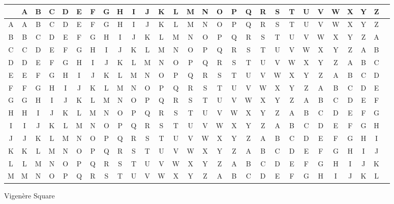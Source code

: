 \documentclass[12pt]{article}
\begin{document}
\begin{figure}[ht]
	
		\caption{Vigen\`{e}re Square}
		\label{vigsquare}
	
\begin{adjustbox}{max width=\textwidth}
	
	\begin{tabular}{| c || c | c | c | c | c | c | c | c | c | c | c | c | c | c | c | c | c | c | c | c | c | c | c | c | c | c | c ||}
		\hline
		 & A & B & C & D & E & F & G & H & I & J & K & L & M & N & O & P & Q & R & S & T & U & V & W & X & Y & Z \\
		\hline\hline
A & A & B & C & D & E & F & G & H & I & J & K & L & M & N & O & P & Q & R & S & T & U & V & W & X & Y & Z \\ \hline
B & B & C & D & E & F & G & H & I & J & K & L & M & N & O & P & Q & R & S & T & U & V & W & X & Y & Z & A \\ \hline
C & C & D & E & F & G & H & I & J & K & L & M & N & O & P & Q & R & S & T & U & V & W & X & Y & Z & A & B \\ \hline
D & D & E & F & G & H & I & J & K & L & M & N & O & P & Q & R & S & T & U & V & W & X & Y & Z & A & B & C \\ \hline
E & E & F & G & H & I & J & K & L & M & N & O & P & Q & R & S & T & U & V & W & X & Y & Z & A & B & C & D \\ \hline
F & F & G & H & I & J & K & L & M & N & O & P & Q & R & S & T & U & V & W & X & Y & Z & A & B & C & D & E \\ \hline
G & G & H & I & J & K & L & M & N & O & P & Q & R & S & T & U & V & W & X & Y & Z & A & B & C & D & E & F \\ \hline
H & H & I & J & K & L & M & N & O & P & Q & R & S & T & U & V & W & X & Y & Z & A & B & C & D & E & F & G \\ \hline
I & I & J & K & L & M & N & O & P & Q & R & S & T & U & V & W & X & Y & Z & A & B & C & D & E & F & G & H \\ \hline
J & J & K & L & M & N & O & P & Q & R & S & T & U & V & W & X & Y & Z & A & B & C & D & E & F & G & H & I \\ \hline
K & K & L & M & N & O & P & Q & R & S & T & U & V & W & X & Y & Z & A & B & C & D & E & F & G & H & I & J \\ \hline
L & L & M & N & O & P & Q & R & S & T & U & V & W & X & Y & Z & A & B & C & D & E & F & G & H & I & J & K \\ \hline
M & M & N & O & P & Q & R & S & T & U & V & W & X & Y & Z & A & B & C & D & E & F & G & H & I & J & K & L \\ \hline

\end{tabular}
\end{adjustbox}
\end{figure}
\end{document}
